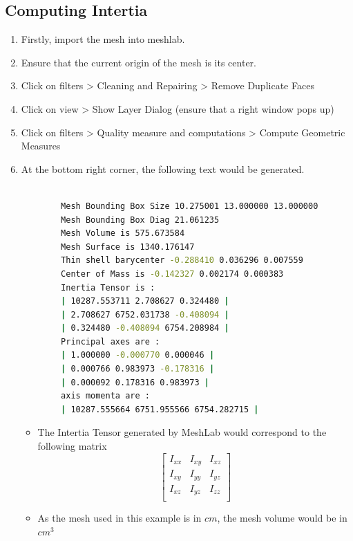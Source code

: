 \documentclass[11pt]{article}
\begin{document}
\subsection{Computing Intertia }
\begin{enumerate}
 \item {Firstly, import the mesh into meshlab.}
 \item{Ensure that the current origin of the mesh is its center.}
 \item{ Click on filters > Cleaning and Repairing > Remove Duplicate Faces}
 \item{ Click on view > Show Layer Dialog (ensure that a right window pops up)}
 \item {Click on filters > Quality measure and computations > Compute Geometric Measures}
 \item {
       At the bottom right corner, the following text would be generated.
       \begin{lstlisting}[language=bash]

        Mesh Bounding Box Size 10.275001 13.000000 13.000000
        Mesh Bounding Box Diag 21.061235
        Mesh Volume is 575.673584
        Mesh Surface is 1340.176147
        Thin shell barycenter -0.288410 0.036296 0.007559
        Center of Mass is -0.142327 0.002174 0.000383
        Inertia Tensor is :
        | 10287.553711 2.708627 0.324480 |
        | 2.708627 6752.031738 -0.408094 |
        | 0.324480 -0.408094 6754.208984 |
        Principal axes are :
        | 1.000000 -0.000770 0.000046 |
        | 0.000766 0.983973 -0.178316 |
        | 0.000092 0.178316 0.983973 |
        axis momenta are :
        | 10287.555664 6751.955566 6754.282715 |

       \end{lstlisting}
       \begin{itemize}
        \item {
              The Intertia Tensor generated by MeshLab would correspond to the following matrix
              $$
               \begin{bmatrix}
                I_{xx} & I_{xy} & I_{xz} \\
                I_{xy} & I_{yy} & I_{yz} \\
                I_{xz} & I_{yz} & I_{zz} \\
               \end{bmatrix}
              $$
              }
        \item{
              As the mesh used in this example is in $cm$, the mesh volume would be in ${cm}^3$
              }
       \end{itemize}
       
       }
\end{enumerate}
\end{document}
